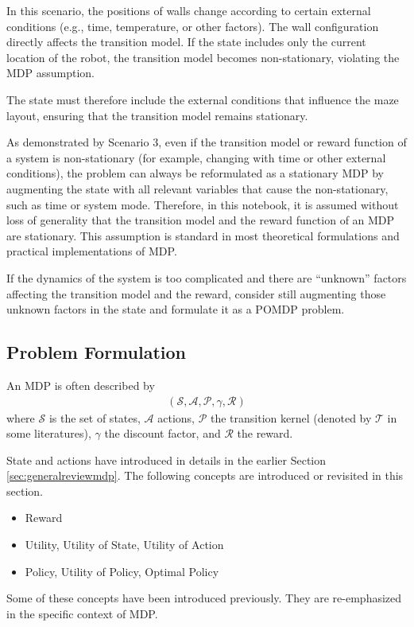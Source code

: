 \begin{mdframed}
\begin{itemize}
		In this scenario, the positions of walls change according to certain external conditions (e.g., time, temperature, or other factors). The wall configuration directly affects the transition model. If the state includes only the current location of the robot, the transition model becomes non-stationary, violating the MDP assumption. 
		
		The state must therefore include the external conditions that influence the maze layout, ensuring that the transition model remains stationary.
	\end{itemize}
	
As demonstrated by Scenario 3, even if the transition model or reward function of a system is non-stationary (for example, changing with time or other external conditions), the problem can always be reformulated as a stationary MDP by augmenting the state with all relevant variables that cause the non-stationary, such as time or system mode. Therefore, in this notebook, it is assumed without loss of generality that the transition model and the reward function of an MDP are stationary. This assumption is standard in most theoretical formulations and practical implementations of MDP.

If the dynamics of the system is too complicated and there are ``unknown'' factors affecting the transition model and the reward, consider still augmenting those unknown factors in the state and formulate it as a POMDP problem.

\end{mdframed}

\subsection{Problem Formulation}

An MDP is often described by
\begin{eqnarray}
	\left(\mathcal{S}, \mathcal{A}, \mathcal{P}, \gamma, \mathcal{R}\right) \nonumber
\end{eqnarray}
where $\mathcal{S}$ is the set of states, $\mathcal{A}$ actions, $\mathcal{P}$ the transition kernel (denoted by $\mathcal{T}$ in some literatures), $\gamma$ the discount factor, and $\mathcal{R}$ the reward.

State and actions have introduced in details in the earlier Section \ref{sec:generalreviewmdp}. The following concepts are introduced or revisited in this section.
\begin{itemize}
	\item Reward
	\item Utility, Utility of State, Utility of Action
	\item Policy, Utility of Policy, Optimal Policy
\end{itemize}
Some of these concepts have been introduced previously. They are re-emphasized in the specific context of MDP.

